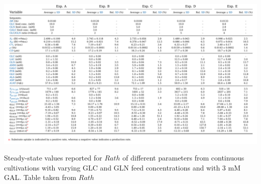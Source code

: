 \documentclass[]{article}
\begin{document}
 	\begin{table}
 		\centering
 		\includegraphics[scale = 0.7]{Table_4_11}
 		\caption{Steady-state values reported for $Rath$ of different parameters from continuous cultivations with varying GLC and GLN feed concentrations and with 3 mM GAL. Table taken from $Rath$}
 		
 	\end{table}
 
\end{document}
